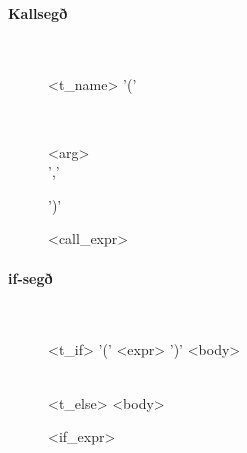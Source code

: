 \documentclass{article}
\begin{document}
\paragraph{Kallsegð} ~\\
\begin{figure}[h!]
	\begin{syntdiag}
	<t_name> '('
	\begin{stack} \\
		\begin{rep} 
			<arg> \\ ','
		\end{rep} 
	\end{stack} 
	')'
	\end{syntdiag}
	\caption{{\textless}call\_expr{\textgreater}}
\end{figure}

\paragraph{if-segð} ~\\
\begin{figure}[h!]
	\begin{syntdiag}
	<t_if> '(' <expr> ')' <body>
	\begin{stack} \\
		<t_else> <body>
	\end{stack} 
	\end{syntdiag}
	\caption{{\textless}if\_expr{\textgreater}}
\end{figure}
\end{document}
